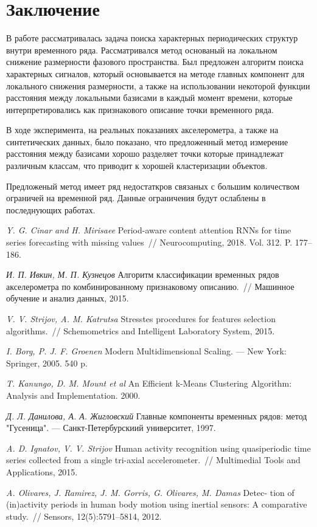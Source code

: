 \documentclass[12pt, twoside]{article}
\begin{document}
\section{Заключение}
В работе рассматривалась задача поиска характерных периодических структур внутри временного ряда. Рассматривался метод основаный на локальном снижение размерности фазового пространства. Был предложен алгоритм поиска характерных сигналов, который основывается на методе главных компонент для локального снижения размерности, а также на использовании некоторой функции расстояния между локальными базисами в каждый момент времени, которые интерпретировались как признакового описание точки временного ряда.

В ходе эксперимента, на реальных показаниях акселерометра, а также на синтетических данных, было показано, что предложенный метод измерение расстояния между базисами хорошо разделяет точки которые принадлежат различным классам, что приводит к хорошей кластеризации объектов.

Предложеный метод имеет ряд недостаткров связаных с большим количеством ограничей на временной ряд. Данные ограничения будут ослаблены в последнующих работах.

\begin{thebibliography}{99}
	\textit{Y. G. Cinar and H. Mirisaee} Period-aware content attention RNNs for time series forecasting with missing values~// Neurocomputing, 2018. Vol. 312. P. 177--186.
	
	\textit{И. П. Ивкин,  М. П. Кузнецов} Алгоритм классификации временных рядов акселерометра по комбинированному признаковому описанию.~// Машинное обучение и анализ данных, 2015.
	
	\textit{V. V. Strijov, A. M. Katrutsa} Stresstes procedures for features selection algorithms.~// Schemometrics and Intelligent Laboratory System, 2015.
	
	\textit{I. Borg, P. J. F. Groenen} Modern Multidimensional Scaling. --- New York: Springer, 2005. 540 p.
	
	\textit{T. Kanungo, D. M. Mount et al} An Efficient k-Means Clustering Algorithm: Analysis and Implementation. 2000.
	
	\textit{Д. Л. Данилова, А. А. Жигловский} Главные компоненты временных рядов: метод "Гусеница". --- Санкт-Петербурскиий университет, 1997.
	
	\textit{A. D. Ignatov, V. V. Strijov} Human activity recognition using quasiperiodic time series collected from a single tri-axial accelerometer.~// Multimedial Tools and Applications, 2015.
	
	\textit{A. Olivares, J. Ramirez, J. M. Gorris, G. Olivares, M. Damas} Detec- tion of (in)activity periods in human body motion using inertial sensors: A comparative study.~// Sensors, 12(5):5791–5814, 2012.

	
\end{thebibliography}
\end{document}
